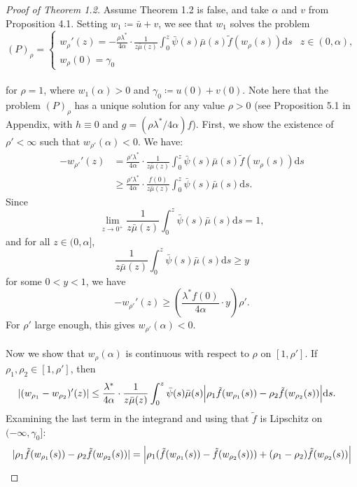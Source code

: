 \documentclass{article}
\begin{document}
\begin{proof}[Proof of Theorem 1.2]
    Assume Theorem 1.2 is false, and take $\alpha$ and $v$ from Proposition 4.1. Setting $w_1 \coloneqq \bar u + v$, we see that $w_1$ solves the problem
    \[(P)_\rho = \begin{cases}w_\rho'(z) = -\frac{\rho\lambda^*}{4\alpha}\cdot\frac{1}{z\bar\mu(z)}\int_0^z\bar\psi(s)\bar\mu(s)\tilde f(w_\rho(s))\mathrm{d}s  & z\in(0,\alpha),\\ w_\rho(0)=\gamma_0\end{cases}\]\\
    for $\rho = 1$, where $w_1(\alpha) > 0$ and $\gamma_0\coloneqq u(0)+v(0)$. Note here that the problem $(P)_\rho$ has a unique solution for any value $\rho > 0$ (see Proposition 5.1 in Appendix, with $h\equiv 0$ and $g = (\rho\lambda^*/4\alpha)f$). First, we show the existence of $\rho' < \infty$ such that $w_{\rho'}(\alpha) < 0$. We have:
    \begin{align*}
        -w_{\rho'}'(z) &= \frac{\rho'\lambda^*}{4\alpha}\cdot\frac{1}{z\bar\mu(z)}\int_0^z\bar\psi(s)\bar\mu(s)\tilde f(w_\rho(s))\mathrm{d}s \\
        &\geq \frac{\rho'\lambda^*}{4\alpha}\cdot \frac{f(0)}{z\bar\mu(z)}\int_0^z\bar\psi(s)\bar\mu(s)\mathrm{d}s.
    \end{align*}
    Since
    \[\lim_{z\to 0^+} \frac 1{z\bar\mu(z)}\int_0^z\bar\psi(s)\bar\mu(s)\mathrm{d}s = 1,\]
    and for all $z\in(0,\alpha]$,
    \[\frac 1{z\bar\mu(z)}\int_0^z\bar\psi(s)\bar\mu(s)\mathrm{d}s \geq y \]
    for some $0<y<1$, we have
    \[-w_{\rho'}'(z) \geq \left(\frac{\lambda^*f(0)}{4\alpha}\cdot y\right)\rho'.\]
    For $\rho'$ large enough, this gives $w_{\rho'}(\alpha) < 0$. \\ \\
    Now we show that $w_\rho(\alpha)$ is continuous with respect to $\rho$ on $[1,\rho']$. If $\rho_1,\rho_2\in[1,\rho']$, then 
    \begin{align*}
        |(w_{\rho_1} - w_{\rho_2})'(z)| &\leq \frac{\lambda^*}{4\alpha}\cdot\frac{1}{z\bar\mu(z)}\int_0^z \bar\psi(s)\bar\mu(s)\Bigl|\rho_1\tilde f(w_{\rho_1}(s)) - \rho_2\tilde f(w_{\rho_2}(s))\Bigr|\mathrm{d}s.
    \end{align*}
    Examining the last term in the integrand and using that $\tilde f$ is Lipschitz on $(-\infty,\gamma_0]$:
    \begin{align*}
        |\rho_1\tilde f(w_{\rho_1}(s)) - \rho_2\tilde f(w_{\rho_2}(s))| &= \Bigl|\rho_1(\tilde f(w_{\rho_1}(s))-\tilde f(w_{\rho_2}(s))) + (\rho_1-\rho_2)\tilde f(w_{\rho_2}(s))\Bigl| \\

\end{align*}
\end{proof}
\end{document}

